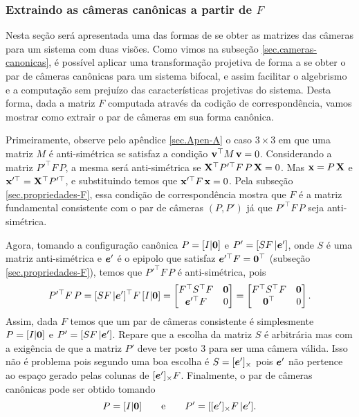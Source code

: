 \subsubsection*{Extraindo as câmeras canônicas a partir de $F$}
Nesta seção será apresentada uma das formas de se obter as matrizes das câmeras para um sistema com duas visões. Como vimos na subseção \ref{sec.cameras-canonicas}, é possível aplicar uma transformação projetiva de forma a se obter o par de câmeras canônicas para um sistema bifocal, e assim facilitar o algebrismo e a computação sem prejuízo das características projetivas do sistema. Desta forma, dada a matriz $F$ computada através da codição de correspondência, vamos mostrar como extrair o par de câmeras em sua forma canônica.

Primeiramente, observe pelo apêndice \ref{sec.Apen-A} o caso $3\times3$ em que uma matriz $M$ é anti-simétrica se satisfaz a condição ${\bf v}^\top M\,{\bf v}=0$. Considerando a matriz $P'^\top F\,P$, a mesma será anti-simétrica se $\mathbf{X}^\top P'^\top F\,P\,\mathbf{X}=0$. Mas $\mathbf{x}=P\,\mathbf{X}$ e $\mathbf{x}'^\top=\mathbf{X}^\top P'^\top$, e substituindo temos que $\mathbf{x}'^\top F\,\mathbf{x}=0$. Pela subseção \ref{sec.propriedades-F}, essa condição de correspondência mostra que $F$ é a matriz fundamental consistente com o par de câmeras $(P,P')$ já que $P'^\top F\,P$ seja anti-simétrica.

Agora, tomando a configuração canônica $P=[I|{\bf 0}]$ e $P'=[SF\,|\boldsymbol{e}']$, onde $S$ é uma matriz anti-simétrica e $\boldsymbol{e}'$ é o epipolo que satisfaz $\boldsymbol{e}'^\top F={\bf 0}^\top$ (subseção \ref{sec.propriedades-F}), temos que $P'^\top F\,P$ é anti-simétrica, pois
\begin{equation*}
P'^\top F\,P=[SF\,|\boldsymbol{e}']^\top F\,[I|{\bf 0}]=
\begin{bmatrix}
F^\top S^\top F&{\bf 0}\\
\boldsymbol{e}'^\top F&0
\end{bmatrix}=
\begin{bmatrix}
F^\top S^\top F&{\bf 0}\\
{\bf 0}^\top&0
\end{bmatrix}.
\end{equation*}
Assim, dada $F$ temos que um par de câmeras consistente é simplesmente $P=[I|{\bf 0}]$ e $P'=[SF\,|\boldsymbol{e}']$. Repare que a escolha da matriz $S$ é arbitrária mas com a exigência de que a matriz $P'$ deve ter posto 3 para ser uma câmera válida. Isso não é problema pois segundo \citep{luong} uma boa escolha é $S=[\boldsymbol{e}']_\times$ pois $\boldsymbol{e}'$ não pertence ao espaço gerado pelas colunas de $[\boldsymbol{e}']_\times F$. Finalmente, o par de câmeras canônicas pode ser obtido tomando 
\begin{equation}\label{eq.cameras-dada-F}
P=[I|{\bf 0}]\qquad\text{e}\qquad P'=[[\boldsymbol{e}']_\times F\,|\boldsymbol{e}'].
\end{equation}

